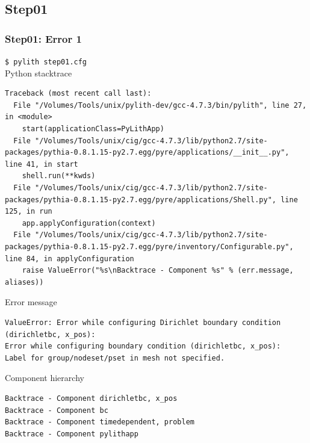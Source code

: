 \documentclass{beamer}
\newcommand{\cmd}[1]{{\tiny\tt \color{ltred}#1}}
\newcommand{\errlabel}[1]{{\small \color{blue}#1}}
\begin{document}
\subsection{Step01}

\begin{frame}[fragile]
  \frametitle{Step01: Error 1}

\cmd{\$ pylith step01.cfg}\\
\errlabel{Python stacktrace}
\begin{lstlisting}
Traceback (most recent call last):
  File "/Volumes/Tools/unix/pylith-dev/gcc-4.7.3/bin/pylith", line 27, in <module>
    start(applicationClass=PyLithApp)
  File "/Volumes/Tools/unix/cig/gcc-4.7.3/lib/python2.7/site-packages/pythia-0.8.1.15-py2.7.egg/pyre/applications/__init__.py", line 41, in start
    shell.run(**kwds)
  File "/Volumes/Tools/unix/cig/gcc-4.7.3/lib/python2.7/site-packages/pythia-0.8.1.15-py2.7.egg/pyre/applications/Shell.py", line 125, in run
    app.applyConfiguration(context)
  File "/Volumes/Tools/unix/cig/gcc-4.7.3/lib/python2.7/site-packages/pythia-0.8.1.15-py2.7.egg/pyre/inventory/Configurable.py", line 84, in applyConfiguration
    raise ValueError("%s\nBacktrace - Component %s" % (err.message, aliases))
\end{lstlisting}
\errlabel{Error message}
\begin{lstlisting}
ValueError: Error while configuring Dirichlet boundary condition (dirichletbc, x_pos):
Error while configuring boundary condition (dirichletbc, x_pos):
Label for group/nodeset/pset in mesh not specified.
\end{lstlisting}
\errlabel{Component hierarchy}
\begin{lstlisting}
Backtrace - Component dirichletbc, x_pos
Backtrace - Component bc
Backtrace - Component timedependent, problem
Backtrace - Component pylithapp
\end{lstlisting}
  
\end{frame}
\end{document}
